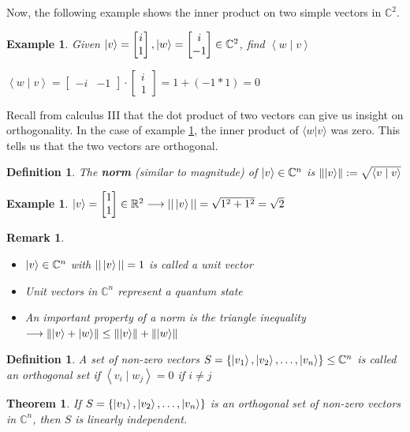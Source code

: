 \documentclass[12pt]{article}
\theoremstyle{plain}
\newtheorem{theorem}[lemma]{Theorem}
\theoremstyle{nonumberplain}
\theoremstyle{plain}
\newtheorem{definition}[lemma]{Definition}
\newtheorem{example}[lemma]{Example}
\newtheorem{remark}[lemma]{Remark}
\theoremstyle{nonumberplain}
\newcommand\1{{\bf 1}}
\newcommand{\bmat}[1]{\begin{bmatrix*} #1 \end{bmatrix*}} %
\newcommand{\R}{\mathbb{R}} %
\newcommand{\C}{\mathbb{C}} %
\newcommand{\<}{\left\langle}
\renewcommand{\>}{\right\rangle}
\newcommand{\lb}{\left\{}
\newcommand{\rb}{\right\}}
\newcommand{\norm}[1]{\left\lVert#1\right\rVert} %
\newcommand{\inp}[2]{\left\langle#1\mid #2\right\rangle} %
\newcommand{\setofkets}[1]{\lb \ket{#1_1}, \ket{#1_2}, \ldots, \ket{#1_n}\rb} %
\begin{document}
Now, the following example shows the inner product on two simple vectors in $\C^2$.
\begin{example}\label{ex:cpcmp}
Given $\ket{v}=\bmat{i \\ 1}, \ket{w}=\bmat{i \\ -1}\in\C^2$, find $\inp{w}{v}$
\begin{center}
$\inp{w}{v}=\bmat{-i & -1}\cdot\bmat{i \\ 1}=1+(-1*1)=0$
\end{center}
\end{example}
Recall from calculus III that the dot product of two vectors can give us insight on orthogonality. In the case of example \ref{ex:cpcmp}, the inner product of $\langle w|v \rangle$ was zero. This tells us that the two vectors are orthogonal.
\begin{definition}
The \textbf{norm} (similar to magnitude) of $\ket{v}\in\C^n$ is $\norm{\ket{v}}:=\sqrt{\inp{v}{v}}$ 
\end{definition}
\begin{example}
$\ket{v}=\bmat{1 \\ 1}\in\R^2\longrightarrow||\ket{v}||=\sqrt{1^2+1^2}=\sqrt{2}$
\end{example}
\begin{remark}
\begin{itemize}
	\item $\ket{v}\in\C^n$ with $||\ket{v}||=1$ is called a unit vector
	\item Unit vectors in $\C^n$ represent a \textit{quantum state}
	\item An important property of a norm is the \textit{triangle inequality} $\longrightarrow\norm{\ket{v}+\ket{w}}\leq\norm{\ket{v}}+\norm{\ket{w}}$
\end{itemize}
\end{remark}
\begin{definition}
A set of non-zero vectors $S=\setofkets{v}\leq\C^n$ is called an orthogonal set if $\inp{v_i}{w_j}=0$ if $i\neq j$
\end{definition}
\begin{theorem}
If $S=\setofkets{v}$ is an orthogonal set of non-zero vectors in $\C^n$, then $S$ is linearly independent.
\end{theorem}
\end{document}
